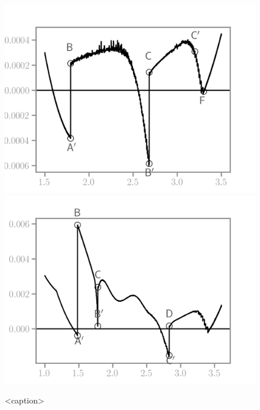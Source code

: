 \begin{figure}[htbp]
    \centering
    \includegraphics*[width=.45\textwidth]{../images/model_stiff_spectrum.png}
    \includegraphics*[width=.45\textwidth]{../images/model_compliant_spectrum.png}
    \caption{<caption>}
    \label{fig:}
\end{figure}

